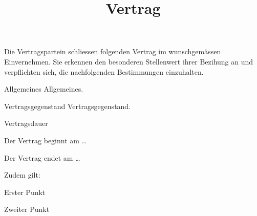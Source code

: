\documentclass[parskip=half]{Classes/custom_contract}
\title{Vertrag}
\begin{document}
\maketitle

\begin{preamble}
    Die Vertragspartein schliessen folgenden Vertrag im wunschgemässen Einvernehmen. Sie erkennen den besonderen Stellenwert ihrer Bezihung an und verpflichten sich, die nachfolgenden Bestimmungen einzuhalten.
\end{preamble}

\begin{article}{Allgemeines}
    Allgemeines.
\end{article}

\begin{article}{Vertragsgegenstand}
    Vertragsgegenstand.
\end{article}

\begin{article}{Vertragsdauer}
    \begin{paragraphs}
        \item Der Vertrag beginnt am \ldots
        \item Der Vertrag endet am \ldots
        \item Zudem gilt:
        \begin{letters}
            \item Erster Punkt
            \item Zweiter Punkt
        \end{letters}
    \end{paragraphs}
\end{article}

\printsignaturelines
\end{document}
